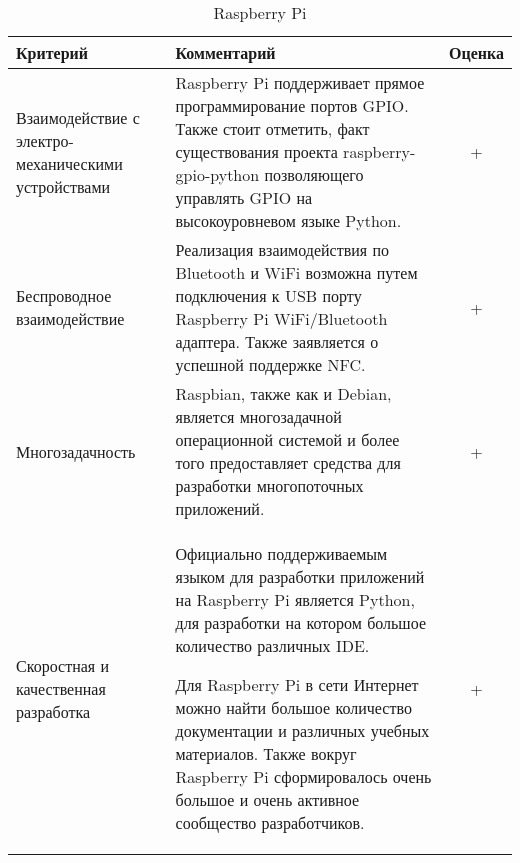 \pagebreak

\bgroup %
\def\arraystretch{1.5}%
  \begin{longtable}{| p{} | p{} | c |} 
  \caption{Raspberry Pi} %
    \hline
      Критерий & Комментарий & Оценка \\
    \hline
      Взаимодействие с электро-механическими устройствами

      & Raspberry Pi поддерживает прямое программирование портов GPIO. Также стоит отметить, факт существования проекта raspberry-gpio-python позволяющего управлять GPIO на высокоуровневом языке Python.  
      & + \\
    \hline
      Беспроводное взаимодействие

      & Реализация взаимодействия по Bluetooth и WiFi возможна путем подключения к USB порту Raspberry Pi WiFi/Bluetooth адаптера. Также заявляется о успешной поддержке NFC.
      
      & + \\
    \hline
      Многозадачность

      & Raspbian, также как и Debian, является многозадачной операционной системой и более того предоставляет средства для разработки многопоточных приложений.

      & + \\
    \hline
      Скоростная и качественная разработка
      
      & Официально поддерживаемым языком для разработки приложений на Raspberry Pi является Python, для разработки на котором большое количество различных IDE.

      Для Raspberry Pi в сети Интернет можно найти большое количество документации и различных учебных материалов. Также вокруг Raspberry Pi сформировалось очень большое и очень активное сообщество разработчиков.

      & + \\
    \hline
  \end{longtable}
\egroup %

\pagebreak

